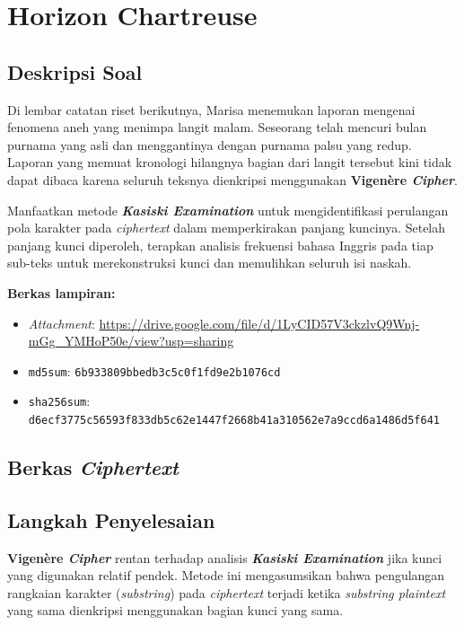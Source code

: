 \section{Horizon Chartreuse}

\subsection*{Deskripsi Soal}

Di lembar catatan riset berikutnya, Marisa menemukan laporan mengenai fenomena
aneh yang menimpa langit malam. Seseorang telah mencuri bulan purnama yang asli
dan menggantinya dengan purnama palsu yang redup. Laporan yang memuat kronologi
hilangnya bagian dari langit tersebut kini tidak dapat dibaca karena seluruh
teksnya dienkripsi menggunakan \textbf{Vigen\`ere \textit{Cipher}}.

Manfaatkan metode \textbf{\textit{Kasiski Examination}} untuk mengidentifikasi
perulangan pola karakter pada \textit{ciphertext} dalam memperkirakan panjang
kuncinya. Setelah panjang kunci diperoleh, terapkan analisis frekuensi bahasa
Inggris pada tiap sub-teks untuk merekonstruksi kunci dan memulihkan seluruh
isi naskah.

\medskip
\noindent\textbf{Berkas lampiran:}
\begin{itemize}[nosep]
  \item \textit{Attachment}: \url{https://drive.google.com/file/d/1LyCID57V3ckzlvQ9Wnj-mGg_YMHoP50e/view?usp=sharing}
  \item \texttt{md5sum}: \texttt{6b933809bbedb3c5c0f1fd9e2b1076cd}
  \item \texttt{sha256sum}: \texttt{d6ecf3775c56593f833db5c62e1447f2668b41a310562e7a9ccd6a1486d5f641}
\end{itemize}

\subsection*{Berkas \textit{Ciphertext}}


\subsection*{Langkah Penyelesaian}

\textbf{Vigen\`ere \textit{Cipher}} rentan terhadap analisis \textbf{\textit{Kasiski Examination}} jika kunci yang digunakan relatif pendek. Metode ini mengasumsikan bahwa pengulangan rangkaian karakter (\textit{substring}) pada \textit{ciphertext} terjadi ketika \textit{substring plaintext} yang sama dienkripsi menggunakan bagian kunci yang sama. 

